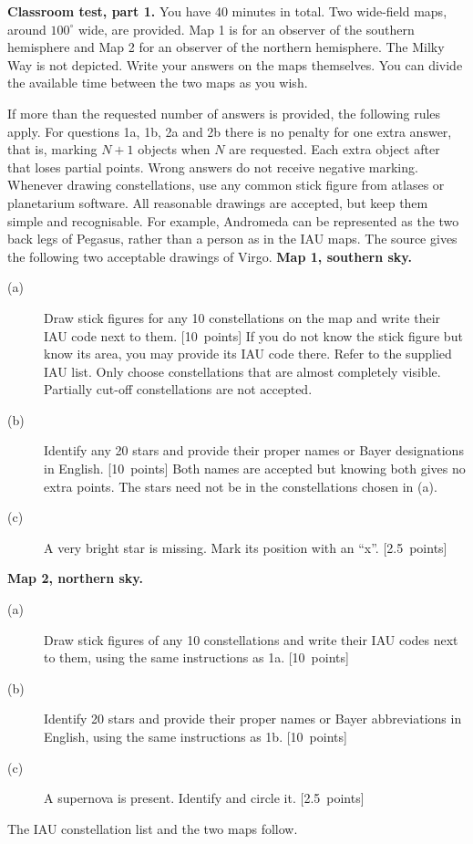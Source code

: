 \textbf{Classroom test, part 1.} You have 40 minutes in total.
Two wide-field maps, around $100^\circ$ wide, are provided. Map 1 is for an observer of the southern
hemisphere and Map 2 for an observer of the northern hemisphere. The Milky Way is not depicted.
Write your answers on the maps themselves. You can divide the available time between the two maps as you wish.

If more than the requested number of answers is provided, the following rules apply.
For questions 1a, 1b, 2a and 2b there is no penalty for one extra answer, that is, marking $N+1$ objects when
$N$ are requested. Each extra object after that loses partial points. Wrong answers do not receive negative marking.
Whenever drawing constellations, use any common stick figure from atlases or planetarium software.
All reasonable drawings are accepted, but keep them simple and recognisable. For example, Andromeda can
be represented as the two back legs of Pegasus, rather than a person as in the IAU maps.
The source gives the following two acceptable drawings of Virgo.
\textbf{Map 1, southern sky.}
\begin{description}
\item[(a)] Draw stick figures for any 10 constellations on the map and write their IAU code next to them. \hfill\mbox{[10 points]}
If you do not know the stick figure but know its area, you may provide its IAU code there.
Refer to the supplied IAU list. Only choose constellations that are almost completely visible.
Partially cut-off constellations are not accepted.
\item[(b)] Identify any 20 stars and provide their proper names or Bayer designations in English. \hfill\mbox{[10 points]}
Both names are accepted but knowing both gives no extra points. The stars need not be in the constellations chosen in (a).
\item[(c)] A very bright star is missing. Mark its position with an ``x''. \hfill\mbox{[2.5 points]}
\end{description}
\textbf{Map 2, northern sky.}
\begin{description}
\item[(a)] Draw stick figures of any 10 constellations and write their IAU codes next to them, using the same instructions as 1a. \hfill\mbox{[10 points]}
\item[(b)] Identify 20 stars and provide their proper names or Bayer abbreviations in English, using the same instructions as 1b. \hfill\mbox{[10 points]}
\item[(c)] A supernova is present. Identify and circle it. \hfill\mbox{[2.5 points]}
\end{description}
The IAU constellation list and the two maps follow.
